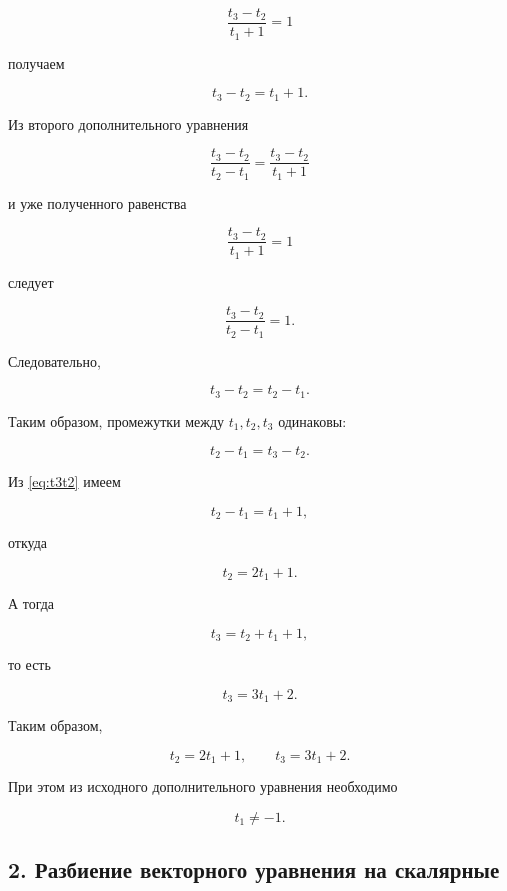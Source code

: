 \documentclass[a4paper,12pt]{article}
\begin{document}
	\[
	\frac{t_3-t_2}{t_1+1}=1
	\]
	
	получаем
	
	\begin{equation}
		t_3-t_2=t_1+1.
		\label{eq:t3t2}
	\end{equation}
	
	Из второго дополнительного уравнения
	
	\[
	\frac{t_3-t_2}{t_2-t_1}
	=
	\frac{t_3-t_2}{t_1+1}
	\]
	
	и уже полученного равенства
	
	\[
	\frac{t_3-t_2}{t_1+1}=1
	\]
	
	следует
	
	\[
	\frac{t_3-t_2}{t_2-t_1}=1.
	\]
	
	Следовательно,
	
	\begin{equation}
		t_3-t_2=t_2-t_1.
		\label{eq:equal}
	\end{equation}
	
	Таким образом, промежутки между $t_1,t_2,t_3$ одинаковы:
	
	\[
	t_2-t_1=t_3-t_2.
	\]
	
	Из \eqref{eq:t3t2} имеем
	
	\[
	t_2-t_1=t_1+1,
	\]
	
	откуда
	
	\begin{equation}
		t_2=2t_1+1.
		\label{eq:t2}
	\end{equation}
	
	А тогда
	
	\[
	t_3=t_2+t_1+1,
	\]
	
	то есть
	
	\begin{equation}
		t_3=3t_1+2.
		\label{eq:t3}
	\end{equation}
	
	Таким образом,
	
	\begin{equation}
		\boxed{
			t_2=2t_1+1,
			\qquad
			t_3=3t_1+2.
		}
	\end{equation}
	
	При этом из исходного дополнительного уравнения необходимо
	
	\begin{equation}
		t_1\neq -1.
	\end{equation}
	
	\subsection*{2. Разбиение векторного уравнения на скалярные}
	
\end{document}
